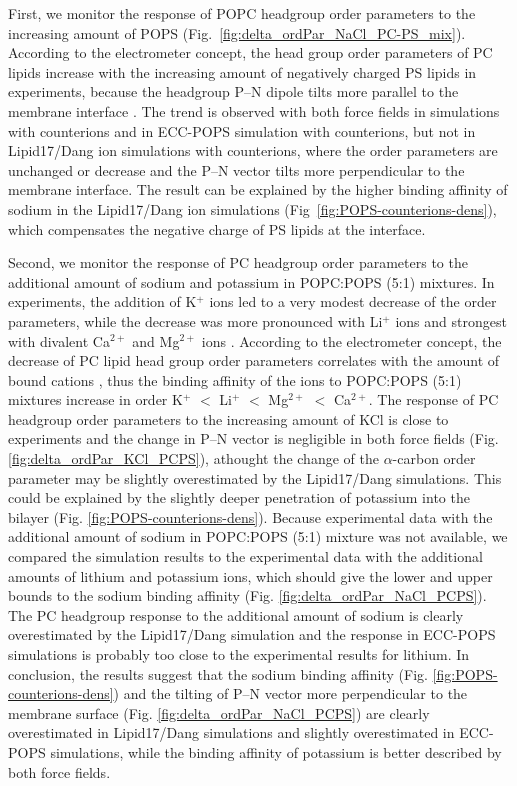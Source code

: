 \documentclass[journal=jpcbfk,manuscript=article]{achemso}
\begin{document}
First, we monitor the response of POPC headgroup order parameters to the increasing amount of POPS (Fig.~\ref{fig:delta_ordPar_NaCl_PC-PS_mix}).
According to the electrometer concept, the head group order parameters of PC lipids increase
with the increasing amount of negatively charged PS lipids in experiments, because the headgroup P--N dipole
tilts more parallel to the membrane interface \cite{seelig87,scherer87}.
The trend is observed with both force fields in simulations with  counterions and
in ECC-POPS simulation with  counterions, but not in Lipid17/Dang ion simulations with  counterions,
where the order parameters are unchanged or decrease and the P--N vector tilts more perpendicular to the membrane interface.
The result can be explained by the higher binding affinity of sodium in the
Lipid17/Dang ion simulations (Fig~\ref{fig:POPS-counterions-dens}), which
compensates the negative charge of PS lipids at the interface.

Second, we monitor the response of PC headgroup order parameters to the additional
amount of sodium and potassium in POPC:POPS (5:1) mixtures.
In experiments, the addition of K$^+$ ions led to a very modest decrease of the order parameters,
while the decrease was more pronounced with Li$^+$ ions and strongest with divalent Ca$^{2+}$ and Mg$^{2+}$ ions \cite{roux90}.
According to the electrometer concept, the decrease of PC lipid head group order parameters
correlates with the amount of bound cations \cite{akutsu81,altenbach84,seelig87,roux90,catte16,NMRlipidsIV},
thus the binding affinity of the ions to POPC:POPS (5:1) mixtures increase in order K$^{+}$ $<$ Li$^{+}$  $<$ Mg$^{2+}$  $<$ Ca$^{2+}$.
The response of PC headgroup order parameters to the increasing amount of KCl is close to experiments
and the change in P--N vector is negligible in both force fields (Fig. \ref{fig:delta_ordPar_KCl_PCPS}), athought the change of the $\alpha$-carbon
order parameter may be slightly overestimated by the Lipid17/Dang simulations. This could be
explained by the slightly deeper penetration of potassium into the bilayer (Fig. \ref{fig:POPS-counterions-dens}).
Because experimental data with the additional amount of sodium in POPC:POPS (5:1) mixture was not available,
we compared the simulation results to the experimental data with the additional amounts of
lithium and potassium ions, which should give the lower and upper bounds to the sodium binding
affinity (Fig. \ref{fig:delta_ordPar_NaCl_PCPS}). The PC headgroup response to the additional
amount of sodium is clearly overestimated by the Lipid17/Dang simulation and
the response in ECC-POPS simulations is probably too close to the experimental results for lithium.
In conclusion, the results suggest that the sodium binding affinity (Fig. \ref{fig:POPS-counterions-dens}) and
the tilting of P--N vector more perpendicular to the membrane surface (Fig. \ref{fig:delta_ordPar_NaCl_PCPS})
are clearly overestimated in Lipid17/Dang simulations and slightly overestimated in ECC-POPS simulations,
while the binding affinity of potassium is better described by both force fields.
\end{document}
